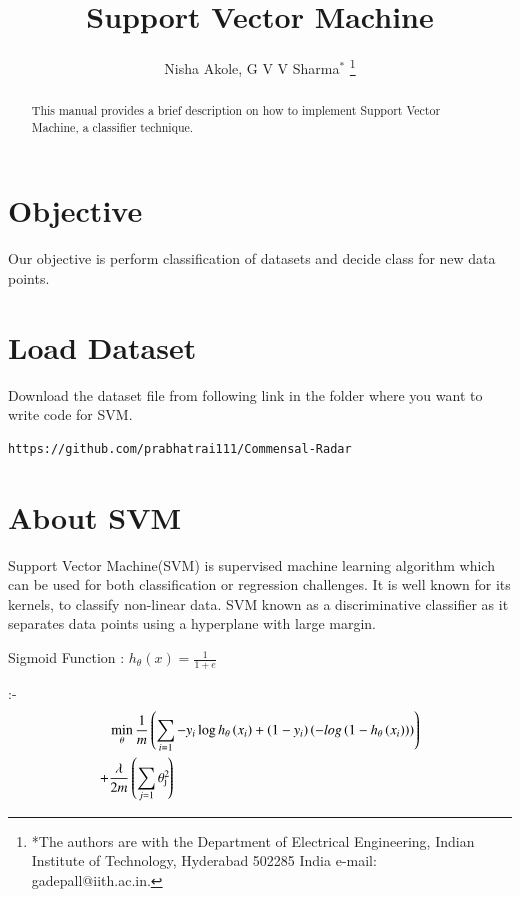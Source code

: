 \documentclass[journal,12pt,twocolumn]{IEEEtran}
\def\SPSB#1#2{\rlap{\textsuperscript{\textcolor{black}{#1}}}\SB{#2}}
\def\SB#1{\textsubscript{\textcolor{black}{#1}}}
\begin{document}
\title{ Support Vector Machine}

\author{Nisha Akole, G V V 
Sharma$^{*}$%
\thanks{*The authors are with the Department
of Electrical Engineering, Indian Institute of Technology, Hyderabad
502285 India e-mail:  gadepall@iith.ac.in.}
}

\maketitle

\tableofcontents

\bigskip
\begin{abstract}
This manual provides a brief description on how to implement Support Vector Machine, a classifier technique.
\end{abstract}

\IEEEpeerreviewmaketitle

\section{Objective}

Our objective is perform classification of datasets and decide class for new data points. 
\section{Load Dataset}
Download the dataset file from following link in the folder where you want to write code for SVM.
\begin{lstlisting}
https://github.com/prabhatrai111/Commensal-Radar
\end{lstlisting}

\section{About SVM}
Support Vector Machine(SVM) is supervised machine learning algorithm which can be used for both classification or regression challenges. It is well known for its kernels, to classify non-linear data. SVM known as a discriminative classifier as it separates data points using a hyperplane with large margin.\\


\begin{center}
Sigmoid Function : $h_{\theta}(x) = {\frac{1}{1 + e}} $
 \end{center}

:-
\begin{align}
    \begin{split}\label{eq:3.1}
         {}& \min_{\mbf{\theta}} \frac{1}{m}\brak{\sum_{i=1}-y_{i}\log h_{\theta}\brak{x_{i}}+ \brak{1-y_{i}} \brak{-log\brak{1-h_{\theta}\brak{x_{i}}}}} \\+ & \frac{\lambda}{2m}\brak{\sum_{j=1}\theta \SPSB{2}{j}}
    \end{split}
\end{align}
\end{document}
